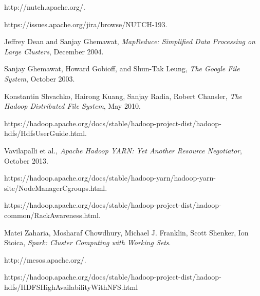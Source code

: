 \documentclass[conference]{IEEEtran}
\begin{document}
\begin{thebibliography}{1}

http://nutch.apache.org/.

https://issues.apache.org/jira/browse/NUTCH-193.

Jeffrey Dean and Sanjay Ghemawat, \emph{MapReduce: Simplified Data Processing on Large Clusters}, December 2004.

Sanjay Ghemawat, Howard Gobioff, and Shun-Tak Leung, \emph{The Google File System}, October 2003.

Konstantin Shvachko, Hairong Kuang, Sanjay Radia, Robert Chansler, \emph{The Hadoop Distributed File System},  May 2010.

https://hadoop.apache.org/docs/stable/hadoop-project-dist/hadoop-hdfs/HdfsUserGuide.html.

Vavilapalli et al., \emph{Apache Hadoop YARN: Yet Another Resource Negotiator}, October 2013.

https://hadoop.apache.org/docs/stable/hadoop-yarn/hadoop-yarn-site/NodeManagerCgroups.html.

https://hadoop.apache.org/docs/stable/hadoop-project-dist/hadoop-common/RackAwareness.html.

Matei Zaharia, Mosharaf Chowdhury, Michael J. Franklin, Scott Shenker, Ion Stoica, \emph{Spark: Cluster Computing with Working Sets}.

http://mesos.apache.org/.

https://hadoop.apache.org/docs/stable/hadoop-project-dist/hadoop-hdfs/HDFSHighAvailabilityWithNFS.html

\end{thebibliography}
\end{document}

